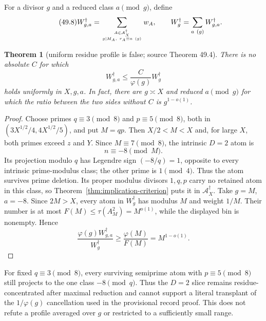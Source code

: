 \documentclass[10pt,reqno]{amsart}
\newtheorem{theorem}{Theorem}[section]
\theoremstyle{definition}
\newcommand{\1}{\mathbf 1}
\begin{document}
For a divisor $g$ and a reduced class $a\pmod g$, define
\begin{equation}\tag{49.8}
 W^\dagger_{g,a}=
 \sum_{A\in\mathcal A_X^\dagger\atop g\mid M_A,
        \ r_A\equiv a\ (g)}w_A,
 \qquad W^\dagger_g=\sum_{a\ (g)}W^\dagger_{g,a}.
\end{equation}
\begin{theorem}[uniform residue profile is false; source Theorem 49.4]
\label{thm:antichain-profile}
There is no absolute $C$ for which
\begin{equation}\tag{49.9}
 W^\dagger_{g,a}\leq\frac C{\varphi(g)}W^\dagger_g
\end{equation}
holds uniformly in $X,g,a$.  In fact, there are $g\asymp X$ and reduced
$a\pmod g$ for which the ratio between the two sides without $C$ is
$g^{1-o(1)}$.
\end{theorem}
\begin{proof}
Choose primes $q\equiv3\pmod8$ and $p\equiv5\pmod8$, both in
$(3X^{1/2}/4,4X^{1/2}/5)$, and put $M=qp$.  Then $X/2<M<X$ and, for large
$X$, both primes exceed $z$ and $Y$.  Since $M\equiv7\pmod8$, the intrinsic
$D=2$ atom is
\begin{equation}\tag{49.10}
                         n\equiv-8\pmod M.
\end{equation}
Its projection modulo $q$ has Legendre sign $(-8/q)=1$, opposite to every
intrinsic prime-modulus class; the other prime is $1\pmod4$.  Thus the atom
survives prime deletion.  Its proper modulus divisors $1,q,p$ carry no
retained atom in this class, so Theorem~\ref{thm:implication-criterion}
puts it in $\mathcal A_X^\dagger$.  Take $g=M$, $a=-8$.  Since $2M>X$,
every atom in $W_g^\dagger$ has modulus $M$ and weight $1/M$.  Their number
is at most $F(M)\leq\tau(A_M^2)=M^{o(1)}$, while the displayed bin is
nonempty.  Hence
\begin{equation}\tag{49.11}
 \frac{\varphi(g)W^\dagger_{g,a}}{W^\dagger_g}
 \geq\frac{\varphi(M)}{F(M)}=M^{1-o(1)}.
\end{equation}
\end{proof}
For fixed $q\equiv3\pmod8$, every surviving semiprime atom with
$p\equiv5\pmod8$ still projects to the one class $-8\pmod q$.  Thus the
$D=2$ slice remains residue-concentrated after maximal reduction and cannot
support a literal transplant of the $1/\varphi(g)$ cancellation used in the
provisional record proof.  This does not refute a profile averaged over $g$
or restricted to a sufficiently small range.
\end{document}
